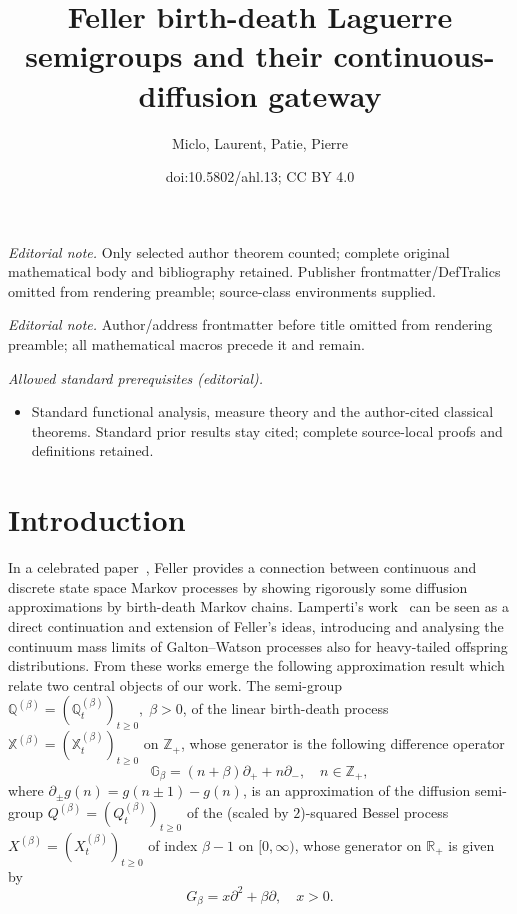 \documentclass[10pt]{amsart}
\title{Feller birth-death Laguerre semigroups and their continuous-diffusion gateway}
\author{Miclo, Laurent, Patie, Pierre}
\date{doi:10.5802/ahl.13; CC BY 4.0}
\theoremstyle{definition}\newtheorem{defi}[theo]{Definition}\newtheorem{rema}[theo]{Remark}\newtheorem{exam}[theo]{Example}\newtheorem{exem}[theo]{Example}\newtheorem{nota}[theo]{Notation}
\newcommand{\RR}{\mathbb{R}}
\newcommand{\ZZ}{\mathbb{Z}}
\newcommand{\pa}{\partial}
\newcommand{\Bg}{G}
\newcommand{\discret}[1]{\mathds{#1}}
\newcommand{\cont}[1]{{#1}}
\begin{document}
\maketitle
\noindent\textit{Editorial note.} Only selected author theorem counted; complete original mathematical body and bibliography retained. Publisher frontmatter/DefTralics omitted from rendering preamble; source-class environments supplied.\par\medskip
\noindent\textit{Editorial note.} Author/address frontmatter before title omitted from rendering preamble; all mathematical macros precede it and remain.\par\medskip
\noindent\textit{Allowed standard prerequisites (editorial).}\begin{itemize}
\item Standard functional analysis, measure theory and the author-cited classical theorems. Standard prior results stay cited; complete source-local proofs and definitions retained.
\end{itemize}\medskip
\section{Introduction}

In a celebrated paper~\cite{Feller-Gen}, Feller provides a connection between continuous and discrete state space Markov processes by showing rigorously some diffusion approximations by birth-death Markov chains. Lamperti's work~\cite{Lamperti-67b} can be seen as a direct continuation and extension of Feller's ideas, introducing and analysing the continuum mass limits of Galton--Watson processes also for heavy-tailed offspring distributions. From these works emerge the following approximation result which relate two central objects of our work. The semi-group $\discret{Q}^{(\beta)}=(\discret{Q}^{(\beta)}_t)_{t\geq 0},\; \beta>0$, of the linear birth-death process $\discret{X}^{(\beta)}=(\discret{X}^{(\beta)}_t)_{t\geq 0}$ on $\ZZ_+$, whose generator is the following difference operator
\begin{equation*}
\discret{G}_{\beta}=(n+\beta) \pa_+ + n\pa_-,\quad n\in \ZZ_+,
\end{equation*}
where $\pa_{\pm}g(n)=g(n\pm 1)-g(n)$, is an approximation of the diffusion semi-group $\cont{Q}^{(\beta)}=(\cont{Q}^{(\beta)}_t)_{t\geq 0}$ of the (scaled by $2$)-squared Bessel process $\cont{X}^{(\beta)}=(\cont{X}^{(\beta)}_t)_{t\geq 0}$ of index $\beta-1$ on $[0,\infty)$, whose generator on $\RR_+$ is given by
\[
\Bg_{\beta}=x\pa^2+\beta\pa, \quad x>0.
\]
\end{document}
